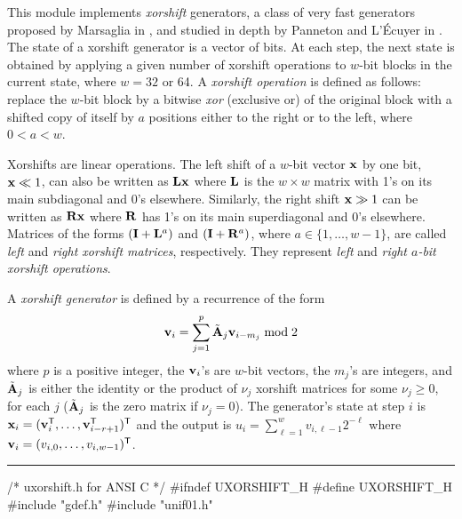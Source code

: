 
\def\OP{\mathop {H}\nolimits}

This module implements \emph{xorshift} generators, a class of very fast
 generators proposed by Marsaglia in \cite{rMAR03a}, and studied
in depth by Panneton and L'\'Ecuyer in  \cite{rPAN04c}.
The state of a xorshift generator is a vector of bits. At each
step, the next state is obtained by applying a given number of
xorshift operations to $w$-bit blocks in the current state, where
$w=32$ or 64. A \emph{xorshift operation} is defined as
follows: replace the $w$-bit block by a bitwise \emph{xor} (exclusive or)
of the original block with a shifted copy of itself by $a$ positions
either to the right or to the left, where $0 < a < w$.

Xorshifts are linear operations.
The left shift of a $w$-bit vector ${\bf x}$ by one bit, ${\bf x} \ll 1$,
can also be written as ${\bf L}{\bf x}$ where ${\bf L}$ is the $w\times w$ matrix
with 1's on its main subdiagonal and 0's elsewhere.
Similarly, the right shift ${\bf x} \gg 1$ can be written as ${\bf R}{\bf x}$
where ${\bf R}$ has 1's on its main superdiagonal and 0's elsewhere.
Matrices of the forms $({\bf I}+{\bf L}^{a})$ and $({\bf I}+{\bf R}^{a})$,
where $a \in \{1,\dots,w-1\}$, are called
\emph{left} and \emph{right xorshift matrices}, respectively.
They represent \emph{left} and \emph{right $a$-bit xorshift operations}.


A \emph{xorshift generator} is defined by a recurrence of the form
\begin{equation}
\label{eq:MRMMprime}
 {\bf v}_i = \sum_{j=1}^p \tilde{{\bf A}}_j {\bf v}_{i-m_j} \bmod 2
\end{equation}
where $p$ is a positive integer, the ${\bf v}_i$'s are $w$-bit vectors, 
the $m_j$'s are integers,
and $\tilde{{\bf A}}_j$ is either the identity or the product of 
$\nu_j$ xorshift matrices for some $\nu_j\ge 0$, 
for each $j$ ($\tilde{{\bf A}}_j$ is the zero matrix if $\nu_j = 0$).
The generator's state at step $i$ is 
${\bf x}_i = ({\bf v}_i^{\sf T},\ldots,{\bf v}_{i-r+1}^{\sf T})^{\sf T}$ and
the output is $u_i = \sum_{\ell=1}^w v_{i,\ell-1} 2^{-\ell}$
where ${\bf v}_i = (v_{i,0},\dots,v_{i,w-1})^{\sf T}$.

\bigskip
\hrule
\code
\hide
/*  uxorshift.h  for ANSI C */
#ifndef UXORSHIFT_H
#define UXORSHIFT_H
\endhide
#include "gdef.h"
#include "unif01.h"


